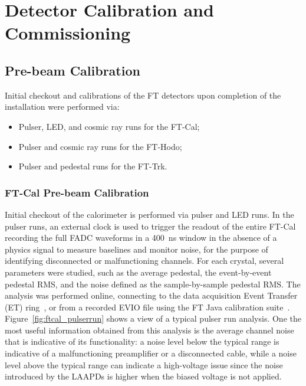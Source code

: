 \section{Detector Calibration and Commissioning}
\label{sec:calibration}

\subsection{Pre-beam Calibration}

Initial checkout and calibrations of the FT detectors upon completion of the installation were performed via:
\begin{itemize}
    \item Pulser, LED, and cosmic ray runs for the FT-Cal;
    \item Pulser and cosmic ray runs for the FT-Hodo;
    \item Pulser and pedestal runs for the FT-Trk.
\end{itemize}

\subsubsection{FT-Cal Pre-beam Calibration}

Initial checkout of the calorimeter is performed via pulser and LED runs. In the pulser runs, an external clock is
used to trigger the readout of the entire FT-Cal recording the full FADC waveforms in a 400~ns window in the
absence of a physics signal to measure baselines and monitor noise, for the purpose of identifying disconnected
or malfunctioning channels. For each crystal, several parameters were studied, such as the average pedestal, the
event-by-event pedestal RMS, and the noise defined as the sample-by-sample pedestal RMS. The analysis was
performed online, connecting to the data acquisition Event Transfer (ET) ring~\cite{daq}, or from a recorded
EVIO file using the FT Java calibration suite~\cite{reconstruction}. Figure~\ref{fig:ftcal_pulserrun} shows a
view of a typical pulser run analysis. One the most useful information
obtained from this analysis is the average channel noise that is indicative of its functionality: a noise level below
the typical range is indicative of a malfunctioning preamplifier or a disconnected cable, while a noise level above the
typical range can indicate a high-voltage issue since the noise introduced by the LAAPDs is higher when the biased
voltage is not applied. 

